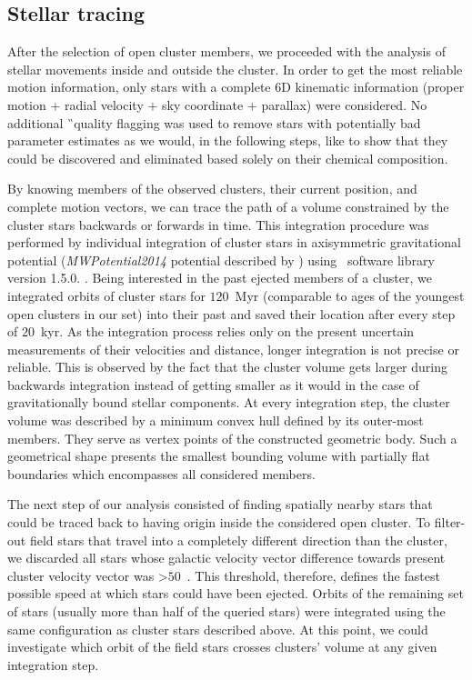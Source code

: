 \subsection{Stellar tracing}
\label{sec:orbit_tracing}
After the selection of open cluster members, we proceeded with the analysis of stellar movements inside and outside the cluster. In order to get the most reliable motion information, only stars with a complete 6D kinematic information (proper motion + radial velocity + sky coordinate + parallax) were considered. No additional \G\ quality flagging was used to remove stars with potentially bad parameter estimates as we would, in the following steps, like to show that they could be discovered and eliminated based solely on their chemical composition.

By knowing members of the observed clusters, their current position, and complete motion vectors, we can trace the path of a volume constrained by the cluster stars backwards or forwards in time. This integration procedure was performed by individual integration of cluster stars in axisymmetric gravitational potential (\textit{MWPotential2014} potential described by \citet{2015ApJS..216...29B}) using \GP\ software library version 1.5.0. \cite{2015ApJS..216...29B}. Being interested in the past ejected members of a cluster, we integrated orbits of cluster stars for $120$~Myr (comparable to ages of the youngest open clusters in our set) into their past and saved their location after every step of $20$~kyr. As the integration process relies only on the present uncertain measurements of their velocities and distance, longer integration is not precise or reliable. This is observed by the fact that the cluster volume gets larger during backwards integration instead of getting smaller as it would in the case of gravitationally bound stellar components. At every integration step, the cluster volume was described by a minimum convex hull defined by its outer-most members. They serve as vertex points of the constructed geometric body. Such a geometrical shape presents the smallest bounding volume with partially flat boundaries which encompasses all considered members.

The next step of our analysis consisted of finding spatially nearby stars that could be traced back to having origin inside the considered open cluster. To filter-out field stars that travel into a completely different direction than the cluster, we discarded all stars whose galactic velocity vector difference towards present cluster velocity vector was >$50$~\kms. This threshold, therefore, defines the fastest possible speed at which stars could have been ejected. Orbits of the remaining set of stars (usually more than half of the queried stars) were integrated using the same configuration as cluster stars described above. At this point, we could investigate which orbit of the field stars crosses clusters' volume at any given integration step.

